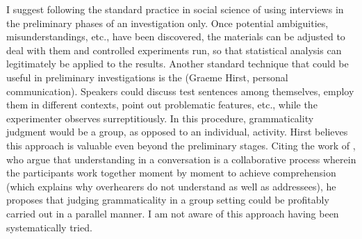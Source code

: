  \noindent
 I suggest following the standard practice in social science of using interviews in the preliminary phases of an investigation only. Once potential ambiguities, misunderstandings, etc., have been discovered, the materials can be adjusted to deal with them and controlled experiments run, so that statistical analysis can legitimately be applied to the results. Another standard technique that could be useful in preliminary investigations is the  (Graeme Hirst, personal communication). Speakers could discuss test sentences among themselves, employ them in different contexts, point out problematic features, etc., while the experimenter observes surreptitiously. In this procedure, grammaticality judgment would be a group, as opposed to an individual, activity. Hirst believes this approach is valuable even beyond the preliminary stages. Citing the work of \citet{SchoberEtAl1989}, who argue that understanding in a conversation is a collaborative process wherein the participants work together moment by moment to achieve comprehension (which explains why overhearers do not understand as well as addressees), he proposes that judging grammaticality in a group setting could be profitably carried out in a parallel manner. I am not aware of this approach having been systematically tried.

